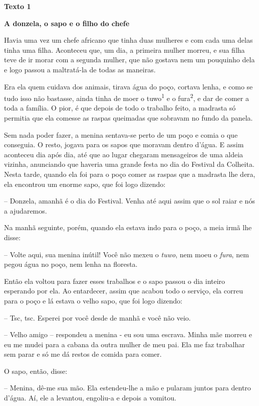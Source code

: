 {\textbf{Texto 1}

\textbf{A donzela, o sapo e o filho do chefe}

Havia uma vez um chefe africano que tinha duas mulheres e com cada uma
delas tinha uma filha. Aconteceu que, um dia, a primeira mulher morreu,
e sua filha teve de ir morar com a segunda mulher, que não gostava nem
um pouquinho dela e logo passou a maltratá-la de todas as maneiras.

Era ela quem cuidava dos animais, tirava água do poço, cortava lenha, e
como se tudo isso não bastasse, ainda tinha de moer o
tuwo\textsuperscript{1} e o fura\textsuperscript{2}, e dar de comer a
toda a família. O pior, é que depois de todo o trabalho feito, a
madrasta só permitia que ela comesse as raspas queimadas que sobravam no
fundo da panela.

Sem nada poder fazer, a menina sentava-se perto de um poço e comia o que
conseguia. O resto, jogava para os sapos que moravam dentro d'água. E
assim aconteceu dia após dia, até que ao lugar chegaram mensageiros de
uma aldeia vizinha, anunciando que haveria uma grande festa no dia do
Festival da Colheita. Nesta tarde, quando ela foi para o poço comer as
raspas que a madrasta lhe dera, ela encontrou um enorme sapo, que foi
logo dizendo:

-- Donzela, amanhã é o dia do Festival. Venha até aqui assim que o sol
raiar e nós a ajudaremos.

Na manhã seguinte, porém, quando ela estava indo para o poço, a meia
irmã lhe disse:

-- Volte aqui, sua menina inútil! Você não mexeu o \emph{tuwo}, nem moeu
o \emph{fura}, nem pegou água no poço, nem lenha na floresta.

Então ela voltou para fazer esses trabalhos e o sapo passou o dia
inteiro esperando por ela. Ao entardecer, assim que acabou todo o
serviço, ela correu para o poço e lá estava o velho sapo, que foi logo
dizendo:

-- Tsc, tsc. Esperei por você desde de manhã e você não veio.

-- Velho amigo -- respondeu a menina - eu sou uma escrava. Minha mãe
morreu e eu me mudei para a cabana da outra mulher de meu pai. Ela me
faz trabalhar sem parar e só me dá restos de comida para comer.

O sapo, então, disse:

-- Menina, dê-me sua mão. Ela estendeu-lhe a mão e pularam juntos para
dentro d'água. Aí, ele a levantou, engoliu-a e depois a vomitou.

}

